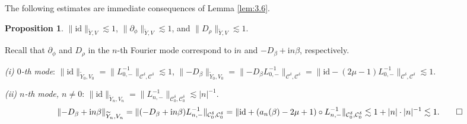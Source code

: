 \documentclass[11pt]{article}
\makeatletter
\renewenvironment{proof}[1][\proofname]{\par
  \vspace{-.7\topsep}%
  \pushQED{\qed}%
  \normalfont
  \topsep0pt \partopsep0pt %
  \trivlist
  \item[\hskip\labelsep
        \itshape
    #1\@addpunct{.}]\ignorespaces
}{%
  \popQED\endtrivlist\@endpefalse
  \addvspace{6pt plus 6pt} %
}
\theoremstyle{definition}
\newtheorem{prop}[theorem]{Proposition}
\theoremstyle{remark}
\numberwithin{equation}{section}
\newcommand{\mbb}{\mathbb}
\newcommand{\mcal}{\mathcal}
\renewcommand{\tilde}{\widetilde}
\newcommand{\Z}{\mbb{Z}}
\newcommand{\del}{\partial}
\newcommand{\norm}[1]{\lVert #1 \rVert}
\makeatother
\begin{document}
%
%

The following estimates are immediate consequences of Lemma \ref{lem:3.6}.

\begin{prop} \label{prop:3.7}
$\norm{\text{id}}_{\tilde{Y}, V} \lesssim 1$, $\norm{\del_\phi}_{\tilde{Y}, V} \lesssim 1$, and $\norm{D_\rho}_{\tilde{Y}, V} \lesssim 1$.
\end{prop}
\begin{proof}
Recall that $\del_\phi$ and $D_\rho$ in the $n$-th Fourier mode correspond to $\textrm{i}n$ and $-D_\beta + \textrm{i}n \beta$, respectively.

\noindent\textit{(i) $0$-th mode}: $\norm{\text{id}}_{\tilde{Y}_0, V_0} = \norm{L_{0,-}^{-1}}_{\mcal{C}^\delta, \mcal{C}^\delta} \lesssim 1$, $\norm{-D_\beta}_{\tilde{Y}_0, V_0} = \norm{-D_\beta L_{0,-}^{-1}}_{\mcal{C}^\delta, \mcal{C}^\delta} = \norm{\text{id} - (2\mu - 1) L_{0,-}^{-1}}_{\mcal{C}^\delta, \mcal{C}^\delta} \lesssim 1$.

\noindent\textit{(ii) $n$-th mode, $n\neq 0$}: $\norm{\text{id}}_{\tilde{Y}_n, V_n} = \norm{L_{n,-}^{-1}}_{\mcal{C}^\delta_0, \mcal{C}^\delta_0} \lesssim |n|^{-1}$.
\[\norm{-D_\beta + \textrm{i}n\beta}_{\tilde{Y}_n, V_n} = \norm{(-D_\beta + \textrm{i}n\beta) L_{n,-}^{-1}}_{\mcal{C}^\delta_0, \mcal{C}^\delta_0} = \norm{\text{id} + (a_n(\beta) - 2\mu + 1) \circ L_{n,-}^{-1}}_{\mcal{C}^\delta_0, \mcal{C}^\delta_0} \lesssim 1 + |n| \cdot |n|^{-1} \lesssim 1. \qedhere\]
\end{proof}
\end{document}
